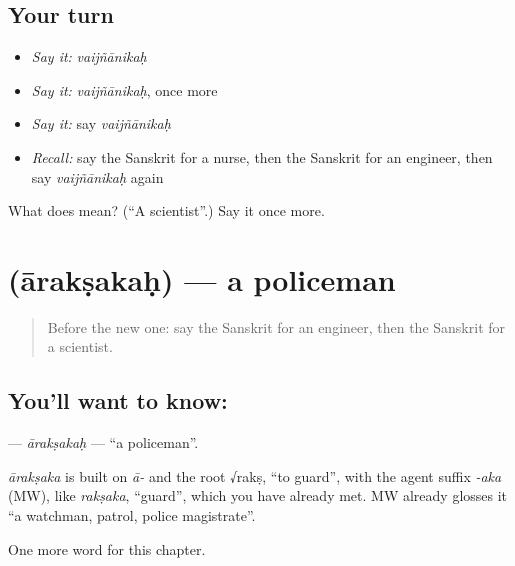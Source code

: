 \subsection*{Your turn}
\begin{itemize}
\raggedright
  \item \emph{Say it:} \emph{vaijñānikaḥ}
  \item \emph{Say it:} \emph{vaijñānikaḥ}, once more
  \item \emph{Say it:} say \emph{vaijñānikaḥ}
  \item \emph{Recall:} say the Sanskrit for a nurse, then the Sanskrit for an engineer, then say \emph{vaijñānikaḥ} again
\end{itemize}

\begin{tcolorbox}[breakable,colback=teal!4,colframe=teal!35!black,title={Before you move on}]
What does  mean? (\textquotedblleft{}A scientist\textquotedblright{}.) Say it once more.
\end{tcolorbox}
\section[\texorpdfstring{\sk{आरक्षकः} (ārakṣakaḥ)}{आरक्षकः (ārakṣakaḥ)}]{ (ārakṣakaḥ) — a policeman}

\label{lesson:SA-C238-araksakah}



\begin{quote}
Before the new one: say the Sanskrit for an engineer, then the Sanskrit for a scientist.
\end{quote}

\subsection*{You'll want to know: }
\textbf{} — \emph{ārakṣakaḥ} — \textquotedblleft{}a policeman\textquotedblright{}.

\begin{cousinweb}
\emph{ārakṣaka} is built on \emph{ā-} and the root √rakṣ, \textquotedblleft{}to guard\textquotedblright{}, with the agent suffix \emph{-aka} (MW), like \emph{rakṣaka}, \textquotedblleft{}guard\textquotedblright{}, which you have already met. MW already glosses it \textquotedblleft{}a watchman, patrol, police magistrate\textquotedblright{}.
\end{cousinweb}

\begin{grammarlens}[title={What you've built}]
One more word for this chapter.
\end{grammarlens}

